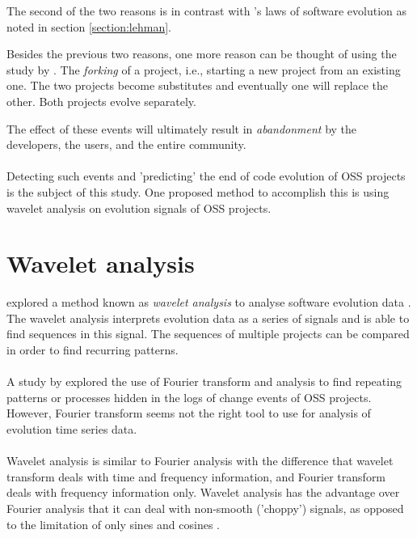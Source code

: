 \noindent
The second of the two reasons is in contrast with \citet{lehman}'s laws of
software evolution as noted in section \ref{section:lehman}.

Besides the previous two reasons, one more reason can be thought of using the
study by \citet{nakakoji}. The \textit{forking} of a project, i.e., starting
a new project from an existing one. The two projects become substitutes and
eventually one will replace the other. Both projects evolve separately.

The effect of these events will ultimately result in \textit{abandonment} by
the developers, the users, and the entire community.

\paragraph{}
Detecting such events and 'predicting' the end of code evolution of OSS projects
is the subject of this study. One proposed method to accomplish this is using
wavelet analysis on evolution signals of OSS projects.



\section{Wavelet analysis}
\label{wavelet_analysis}
\citeauthor{karus2013} explored a method known as \textit{wavelet analysis} to
analyse software evolution data \cite{karus2013, karus20132}. The wavelet
analysis interprets evolution data as a series of signals and is able to find
sequences in this signal. The sequences of multiple projects can be compared in
order to find recurring patterns.

\paragraph{}
A study by \citet{hindle} explored the use of Fourier transform and analysis to
find repeating patterns or processes hidden in the logs of change events of OSS
projects. However, Fourier transform seems not the right tool to use for
analysis of evolution time series data.

\paragraph{}
Wavelet analysis is similar to Fourier analysis with the difference that
wavelet transform deals with time and frequency information, and Fourier
transform deals with frequency information only. Wavelet analysis has the
advantage over Fourier analysis that it can deal with non-smooth ('choppy')
signals, as opposed to the limitation of only sines and cosines \cite{graps}.

